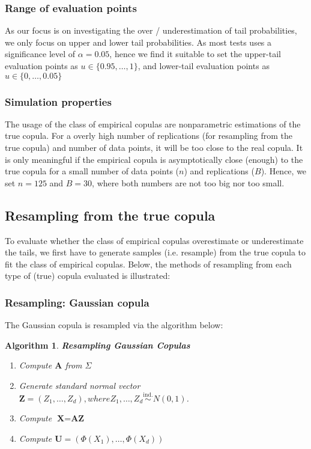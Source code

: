 \documentclass[12pt]{report}
\newtheorem{algorithmold}{Algorithm}[section]
\newcommand{\1}{\mathbf{1}}
\begin{document}
\begin{flushleft}
\subsubsection{Range of evaluation points}
As our focus is on investigating the over / underestimation of tail probabilities, we only focus on upper and lower tail probabilities. As most tests uses a significance level of $\alpha = 0.05$, hence we find it suitable to set the upper-tail evaluation points as $u \in \{ 0.95, \dots, 1 \}$, and lower-tail evaluation points as $u \in \{ 0, \dots, 0.05 \}$

\subsubsection{Simulation properties}
The usage of the class of empirical copulas are nonparametric estimations of the true copula. For a overly high number of replications (for resampling from the true copula) and number of data points, it will be too close to the real copula. It is only meaningful if the empirical copula is asymptotically close (enough) to the true copula for a small number of data points ($n$) and replications ($B$). Hence, we set $n = 125$ and $B = 30$, where both numbers are not too big nor too small.
\vspace{0.5cm}
\subsection{Resampling from the true copula}
\vspace{0.5cm}
To evaluate whether the class of empirical copulas overestimate or underestimate the tails, we first have to generate samples (i.e. resample) from the true copula to fit the class of empirical copulas. Below, the methods of resampling from each type of (true) copula evaluated is illustrated:

\subsubsection{Resampling: Gaussian copula}
The Gaussian copula is resampled via the algorithm below:
\begin{algorithmold}\label{GaussianCopulaResampling}
\textit{\normalfont\parencite{HofertBook}}\:
\textbf{Resampling Gaussian Copulas}\\
\begin{enumerate}
\item Compute $\textbf{A}$ from $\Sigma$
\item Generate standard normal vector $\textbf{Z} = (Z_{1}, \dots, Z_{d}), where Z_{1}, \dots, Z_{d} \overset{\text{ind.}}{\sim} N(0,1)$.
\item Compute $\textbf{X} = \textbf{AZ}$
\item Compute $\textbf{U} = (\Phi(X_{1}), \dots, \Phi(X_{d}))$
\end{enumerate}
\end{algorithmold}

\end{flushleft}
\end{document}
